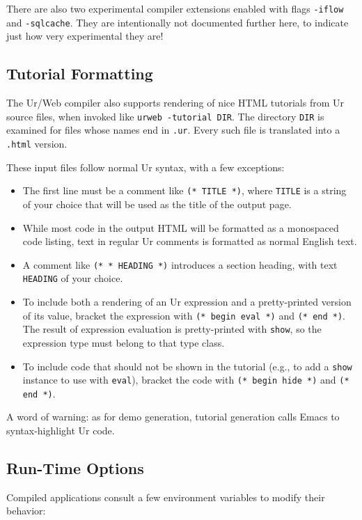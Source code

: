 \documentclass{article}
\newcommand{\cd}[1]{\texttt{#1}}
\begin{document}
There are also two experimental compiler extensions enabled with flags \texttt{-iflow} and \texttt{-sqlcache}.  They are intentionally not documented further here, to indicate just how very experimental they are!

\subsection{Tutorial Formatting}

The Ur/Web compiler also supports rendering of nice HTML tutorials from Ur source files, when invoked like \cd{urweb -tutorial DIR}.  The directory \cd{DIR} is examined for files whose names end in \cd{.ur}.  Every such file is translated into a \cd{.html} version.

These input files follow normal Ur syntax, with a few exceptions:
\begin{itemize}
\item The first line must be a comment like \cd{(* TITLE *)}, where \cd{TITLE} is a string of your choice that will be used as the title of the output page.
\item While most code in the output HTML will be formatted as a monospaced code listing, text in regular Ur comments is formatted as normal English text.
\item A comment like \cd{(* * HEADING *)} introduces a section heading, with text \cd{HEADING} of your choice.
\item To include both a rendering of an Ur expression and a pretty-printed version of its value, bracket the expression with \cd{(* begin eval *)} and \cd{(* end *)}.  The result of expression evaluation is pretty-printed with \cd{show}, so the expression type must belong to that type class.
\item To include code that should not be shown in the tutorial (e.g., to add a \cd{show} instance to use with \cd{eval}), bracket the code with \cd{(* begin hide *)} and \cd{(* end *)}.
\end{itemize}

A word of warning: as for demo generation, tutorial generation calls Emacs to syntax-highlight Ur code.

\subsection{Run-Time Options}

Compiled applications consult a few environment variables to modify their behavior:
\end{document}
